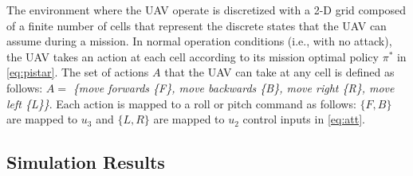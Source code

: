 \documentclass[letterpaper, 10 pt, conference]{ieeeconf}  %
\begin{document}
The environment where the UAV operate is discretized with a 2-D grid composed of a finite number of cells that represent the discrete states that the UAV can assume during a mission.
In normal operation conditions (i.e., with no attack), the UAV takes an action at each cell according to its mission optimal policy $\pi^*$ in \eqref{eq:pistar}. The set of actions $A$ that the UAV can take at any cell is defined as follows:
$A =$ \textit{\{move forwards \{F\}, move backwards \{B\}, move right \{R\}, move left \{L\}\}}.
Each action is mapped to a roll or pitch command as follows: $\{F, B\}$ are mapped to $u_3$ and $\{L, R\}$ are mapped to $u_2$ control inputs in \eqref{eq:att}. 
\subsection{Simulation Results}
\end{document}
